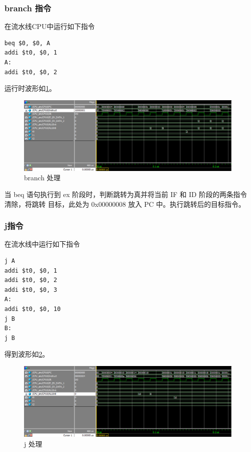 \documentclass{ctexart}
\begin{document}
	\subsubsection{branch 指令}

	在流水线CPU中运行如下指令
	\begin{lstlisting}
beq $0, $0, A
addi $t0, $0, 1
A:
addi $t0, $0, 2
	\end{lstlisting}

	运行时波形如\ref{simpicture10}。

	\begin{figure}[ht]
		\centering
		\includegraphics[width = \textwidth]{PipelineTestWave3.eps}
		\caption{branch 处理}
		\label{simpicture10}
	\end{figure}
	当 beq 语句执行到 ex 阶段时，判断跳转为真并将当前 IF 和 ID 阶段的两条指令清除，将跳转
目标，此处为 0x00000008 放入 PC 中。执行跳转后的目标指令。

	\subsubsection{j指令}
	
	在流水线中运行如下指令

\begin{lstlisting}
j A
addi $t0, $0, 1
addi $t0, $0, 2
addi $t0, $0, 3
A:
addi $t0, $0, 10
j B
B:
j B
\end{lstlisting}

	得到波形如\ref{simpicture11}。

	\begin{figure}[ht]
		\centering
		\includegraphics[width = \textwidth]{PipelineTestWave4.eps}
		\caption{j 处理}
		\label{simpicture11}
	\end{figure}
\end{document}
